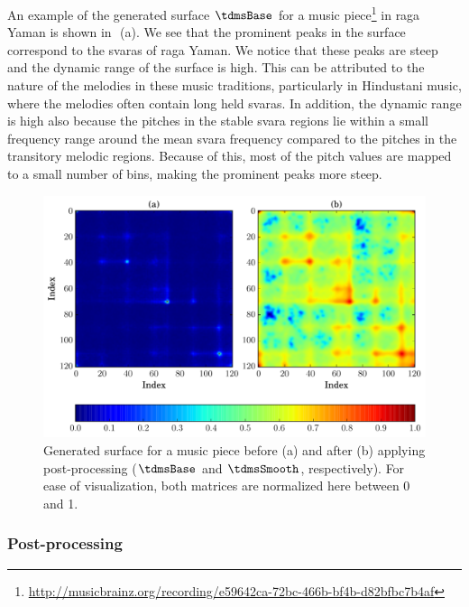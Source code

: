An example of the generated surface $\tdmsBase$ for a music piece\footnote{\url{http://musicbrainz.org/recording/e59642ca-72bc-466b-bf4b-d82bfbc7b4af}} in \gls{raga} Yaman is shown in~\,(a). We see that the prominent peaks in the surface correspond to the \glspl{svara} of \gls{raga} Yaman. We notice that these peaks are steep and the dynamic range of the surface is high. This can be attributed to the nature of the melodies in these music traditions, particularly in Hindustani music, where the melodies often contain long held \glspl{svara}. In addition, the dynamic range is high also because the pitches in the stable \gls{svara} regions lie within a small frequency range around the mean \gls{svara} frequency compared to the pitches in the transitory melodic regions. Because of this, most of the pitch values are mapped to a small number of bins, making the prominent peaks more steep.

\begin{figure}
	\begin{center}
		\includegraphics[width=\figSizeHundred]{ch07_ragaRecognition/figures/PSfeature_e59642ca-72bc-466b-bf4b-d82bfbc7b4af.pdf}
	\end{center}
	\caption{Generated surface for a music piece before (a) and after (b) applying post-processing ($\tdmsBase$ and $\tdmsSmooth$, respectively). For ease of visualization, both matrices are normalized here between 0 and 1.}
	\label{fig:phase_space_surface}
\end{figure}

\subsubsection{Post-processing}
\label{sec:tdms_post_processing}

